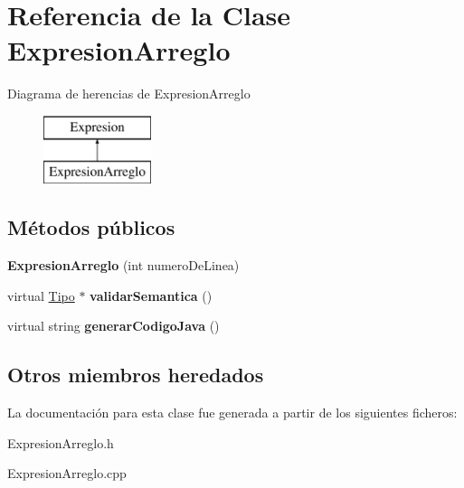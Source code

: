 \hypertarget{class_expresion_arreglo}{\section{Referencia de la Clase Expresion\-Arreglo}
\label{class_expresion_arreglo}
}
Diagrama de herencias de Expresion\-Arreglo\begin{figure}[H]
\begin{center}
\leavevmode
\includegraphics[height=2.000000cm]{class_expresion_arreglo}
\end{center}
\end{figure}
\subsection*{Métodos públicos}
\begin{DoxyCompactItemize}
\item 
\hypertarget{class_expresion_arreglo_a2713349df69f609421bb9fc363827d34}{{\bfseries Expresion\-Arreglo} (int numero\-De\-Linea)}\label{class_expresion_arreglo_a2713349df69f609421bb9fc363827d34}

\item 
\hypertarget{class_expresion_arreglo_aef6f63ff7e04452693c2a3dcb403d0af}{virtual \hyperlink{class_tipo}{Tipo} $\ast$ {\bfseries validar\-Semantica} ()}\label{class_expresion_arreglo_aef6f63ff7e04452693c2a3dcb403d0af}

\item 
\hypertarget{class_expresion_arreglo_a51ad1867ddbd683a3926583788b8075d}{virtual string {\bfseries generar\-Codigo\-Java} ()}\label{class_expresion_arreglo_a51ad1867ddbd683a3926583788b8075d}

\end{DoxyCompactItemize}
\subsection*{Otros miembros heredados}


La documentación para esta clase fue generada a partir de los siguientes ficheros\-:\begin{DoxyCompactItemize}
\item 
Expresion\-Arreglo.\-h\item 
Expresion\-Arreglo.\-cpp\end{DoxyCompactItemize}
